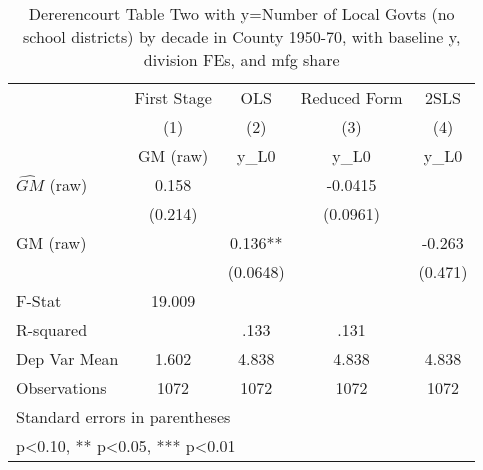 \begin{table}[htbp]\centering
\def\sym#1{\ifmmode^{#1}\else\(^{#1}\)\fi}
\caption{Dererencourt Table Two with y=Number of Local Govts (no school districts) by decade in County 1950-70, with baseline y, division FEs, and mfg share}
\begin{tabular}{l*{4}{c}}
\toprule
                    & First Stage   &         OLS   &Reduced Form   &        2SLS   \\
                    &\multicolumn{1}{c}{(1)}&\multicolumn{1}{c}{(2)}&\multicolumn{1}{c}{(3)}&\multicolumn{1}{c}{(4)}\\
                    &\multicolumn{1}{c}{GM  (raw)}&\multicolumn{1}{c}{y\_L0}&\multicolumn{1}{c}{y\_L0}&\multicolumn{1}{c}{y\_L0}\\
\midrule
$\hat{GM}$ (raw)    &       0.158   &               &     -0.0415   &               \\
                    &     (0.214)   &               &    (0.0961)   &               \\
\addlinespace
GM  (raw)           &               &       0.136** &               &      -0.263   \\
                    &               &    (0.0648)   &               &     (0.471)   \\
\midrule
F-Stat              &      19.009   &               &               &               \\
R-squared           &               &        .133   &        .131   &               \\
Dep Var Mean        &       1.602   &       4.838   &       4.838   &       4.838   \\
Observations        &        1072   &        1072   &        1072   &        1072   \\
\bottomrule
\multicolumn{5}{l}{\footnotesize Standard errors in parentheses}\\
\multicolumn{5}{l}{\footnotesize * p<0.10, ** p<0.05, *** p<0.01}\\
\end{tabular}
\end{table}
